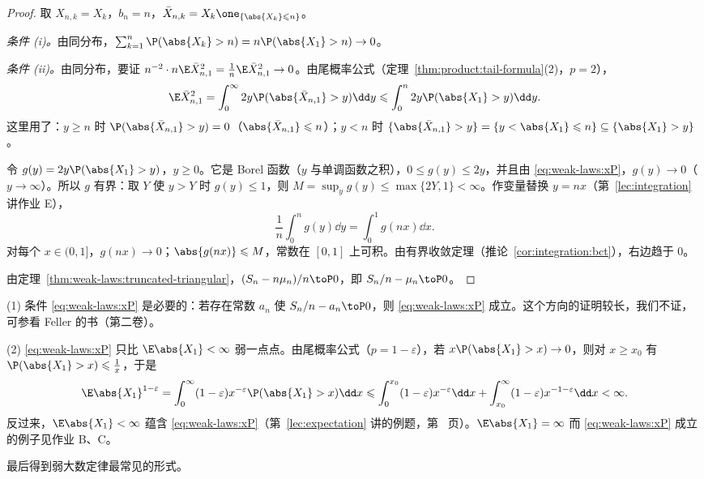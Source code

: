 \begin{proof}
取 $X_{n,k}=X_k$，$b_n=n$，$\bar X_{n,k}=X_k\one_{\{\abs{X_k}\leqslant n\}}$。

\emph{条件 (i)。}由同分布，$\sum_{k=1}^n\P(\abs{X_k}>n)=n\P(\abs{X_1}>n)\to0$。

\emph{条件 (ii)。}由同分布，要证 $n^{-2}\cdot n\E\bar X_{n,1}^2=\frac1n\E\bar X_{n,1}^2\to0$。由尾概率公式（定理~\ref{thm:product:tail-formula}(2)，$p=2$），
\[
\E\bar X_{n,1}^2=\int_0^\infty2y\P(\abs{\bar X_{n,1}}>y)\dd y\leqslant\int_0^n2y\P(\abs{X_1}>y)\dd y .
\]
这里用了：$y\geqslant n$ 时 $\P(\abs{\bar X_{n,1}}>y)=0$（$\abs{\bar X_{n,1}}\leqslant n$）；$y<n$ 时 $\{\abs{\bar X_{n,1}}>y\}=\{y<\abs{X_1}\leqslant n\}\subseteq\{\abs{X_1}>y\}$。

令 $g(y)=2y\P(\abs{X_1}>y)$，$y\geqslant0$。它是 Borel 函数（$y$ 与单调函数之积），$0\leqslant g(y)\leqslant2y$，并且由 \eqref{eq:weak-laws:xP}，$g(y)\to0$（$y\to\infty$）。所以 $g$ 有界：取 $Y$ 使 $y>Y$ 时 $g(y)\leqslant1$，则 $M=\sup_yg(y)\leqslant\max\{2Y,1\}<\infty$。作变量替换 $y=nx$（第~\ref{lec:integration} 讲作业 E），
\[
\frac1n\int_0^ng(y)\dd y=\int_0^1g(nx)\dd x .
\]
对每个 $x\in(0,1]$，$g(nx)\to0$；$\abs{g(nx)}\leqslant M$，常数在 $[0,1]$ 上可积。由有界收敛定理（推论~\ref{cor:integration:bct}），右边趋于 $0$。

由定理~\ref{thm:weak-laws:truncated-triangular}，$(S_n-n\mu_n)/n\toP0$，即 $S_n/n-\mu_n\toP0$。
\end{proof}

\begin{remark}
(1) 条件 \eqref{eq:weak-laws:xP} 是必要的：若存在常数 $a_n$ 使 $S_n/n-a_n\toP0$，则 \eqref{eq:weak-laws:xP} 成立。这个方向的证明较长，我们不证，可参看 Feller 的书（第二卷）。

(2) \eqref{eq:weak-laws:xP} 只比 $\E\abs{X_1}<\infty$ 弱一点点。由尾概率公式（$p=1-\varepsilon$），若 $x\P(\abs{X_1}>x)\to0$，则对 $x\geqslant x_0$ 有 $\P(\abs{X_1}>x)\leqslant\frac1x$，于是
\[
\E\abs{X_1}^{1-\varepsilon}=\int_0^\infty(1-\varepsilon)x^{-\varepsilon}\P(\abs{X_1}>x)\dd x\leqslant\int_0^{x_0}(1-\varepsilon)x^{-\varepsilon}\dd x+\int_{x_0}^\infty(1-\varepsilon)x^{-1-\varepsilon}\dd x<\infty .
\]
反过来，$\E\abs{X_1}<\infty$ 蕴含 \eqref{eq:weak-laws:xP}（第~\ref{lec:expectation} 讲的例题，第~\pageref{we:expectation:tP} 页）。$\E\abs{X_1}=\infty$ 而 \eqref{eq:weak-laws:xP} 成立的例子见作业 B、C。
\end{remark}

最后得到弱大数定律最常见的形式。

